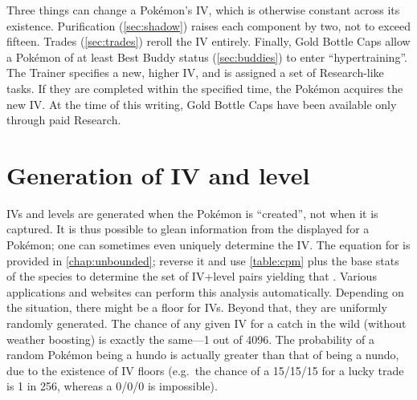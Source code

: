 Three things can change a Pokémon's IV, which is otherwise constant across its existence.
Purification (\autoref{sec:shadow}) raises each component by two, not to exceed fifteen.
Trades (\autoref{sec:trades}) reroll the IV entirely.
Finally, Gold Bottle Caps allow a Pokémon of at least Best Buddy status (\autoref{sec:buddies})
  to enter ``hypertraining''.
The Trainer specifies a new, higher IV, and is assigned a set of Research-like tasks.
If they are completed within the specified time, the Pokémon acquires the new IV.
At the time of this writing, Gold Bottle Caps have been available only through paid Research.

\section{Generation of IV and level\label{sec:ivgeneration}}
IVs and levels are generated when the Pokémon is ``created'', not when it is captured.
It is thus possible to glean information from the \CP{} displayed for a Pokémon;
  one can sometimes even uniquely determine the IV\@.
The equation for \CP{} is provided in \autoref{chap:unbounded}; reverse it and
  use \autoref{table:cpm} plus the base stats of the species to determine
  the set of IV+level pairs yielding that \CP\@.
Various applications and websites can perform this analysis automatically.
Depending on the situation, there might be a floor for IVs.
Beyond that, they are uniformly randomly generated.
The chance of any given IV for a catch in the wild (without weather boosting)
  is exactly the same---1 out of 4096.
The probability of a random Pokémon being a hundo is actually
  greater than that of being a nundo, due to the existence of IV floors
  (e.g.\ the chance of a 15/15/15 for a lucky trade is 1 in 256, whereas
  a 0/0/0 is impossible).
